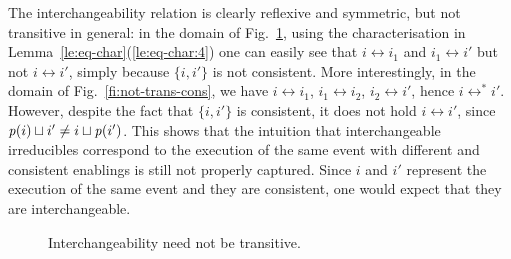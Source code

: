 The interchangeability relation is clearly reflexive and symmetric, but not
transitive in general: in the domain of Fig.~\ref{fi:not-trans}, using the characterisation in Lemma~\ref{le:eq-char}(\ref{le:eq-char:4}) one can easily see that
$i \leftrightarrow i_1$ and $i_1 \leftrightarrow i'$ but not
$i \leftrightarrow i'$, simply because
$\{i, i'\}$ is not consistent.
%
More interestingly, in the domain of Fig.~\ref{fi:not-trans-cons}, we have $i \leftrightarrow i_1$, $i_1 \leftrightarrow i_2$, $i_2 \leftrightarrow i'$, hence $i \leftrightarrow^* i'$. However, despite the fact that $\{i, i'\}$ is consistent, it does not hold $i \leftrightarrow i'$, since $\mathit{p}({i}) \sqcup i' \neq i \sqcup \mathit{p}({i'})$. 
%
This shows that the intuition that
interchangeable irreducibles correspond to the execution of the
same event with different and consistent enablings is still not properly captured. Since $i$ and $i'$ represent the execution of the same event and they are consistent, one would expect that they are interchangeable.



\begin{figure}
  \begin{center}
  \end{center}
  
\caption{Interchangeability need not be transitive.}
\label{fi:not-trans}
\end{figure}




